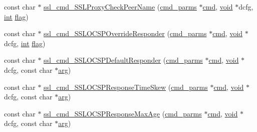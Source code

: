 \begin{DoxyCompactItemize}
\item 
const char $\ast$ \hyperlink{group__MOD__SSL__PRIVATE_ga1680991d78101944b35d1033291deefc}{ssl\+\_\+cmd\+\_\+\+S\+S\+L\+Proxy\+Check\+Peer\+Name} (\hyperlink{group__APACHE__CORE__CONFIG_ga1791fbd28d06a9847bad001541c5241e}{cmd\+\_\+parms} $\ast$\hyperlink{group__apr__thread__proc_ga7b715f5a87a71c6766684c1798251237}{cmd}, \hyperlink{group__MOD__ISAPI_gacd6cdbf73df3d9eed42fa493d9b621a6}{void} $\ast$dcfg, \hyperlink{pcre_8txt_a42dfa4ff673c82d8efe7144098fbc198}{int} \hyperlink{group__apr__mmap_gac9ec9a6de38e93927dca656ab65d0087}{flag})
\item 
const char $\ast$ \hyperlink{group__MOD__SSL__PRIVATE_ga19370828f87340e0ddd9bee5dfa74638}{ssl\+\_\+cmd\+\_\+\+S\+S\+L\+O\+C\+S\+P\+Override\+Responder} (\hyperlink{group__APACHE__CORE__CONFIG_ga1791fbd28d06a9847bad001541c5241e}{cmd\+\_\+parms} $\ast$\hyperlink{group__apr__thread__proc_ga7b715f5a87a71c6766684c1798251237}{cmd}, \hyperlink{group__MOD__ISAPI_gacd6cdbf73df3d9eed42fa493d9b621a6}{void} $\ast$dcfg, \hyperlink{pcre_8txt_a42dfa4ff673c82d8efe7144098fbc198}{int} \hyperlink{group__apr__mmap_gac9ec9a6de38e93927dca656ab65d0087}{flag})
\item 
const char $\ast$ \hyperlink{group__MOD__SSL__PRIVATE_ga33fbb291289472efd27beb62940c44f5}{ssl\+\_\+cmd\+\_\+\+S\+S\+L\+O\+C\+S\+P\+Default\+Responder} (\hyperlink{group__APACHE__CORE__CONFIG_ga1791fbd28d06a9847bad001541c5241e}{cmd\+\_\+parms} $\ast$\hyperlink{group__apr__thread__proc_ga7b715f5a87a71c6766684c1798251237}{cmd}, \hyperlink{group__MOD__ISAPI_gacd6cdbf73df3d9eed42fa493d9b621a6}{void} $\ast$dcfg, const char $\ast$\hyperlink{group__APACHE__CORE__MUTEX_gaf6517210150d97cd5cb8a17e3768770d}{arg})
\item 
const char $\ast$ \hyperlink{group__MOD__SSL__PRIVATE_ga2e4c6b9977860eaacee0f78edc5d8d0e}{ssl\+\_\+cmd\+\_\+\+S\+S\+L\+O\+C\+S\+P\+Response\+Time\+Skew} (\hyperlink{group__APACHE__CORE__CONFIG_ga1791fbd28d06a9847bad001541c5241e}{cmd\+\_\+parms} $\ast$\hyperlink{group__apr__thread__proc_ga7b715f5a87a71c6766684c1798251237}{cmd}, \hyperlink{group__MOD__ISAPI_gacd6cdbf73df3d9eed42fa493d9b621a6}{void} $\ast$dcfg, const char $\ast$\hyperlink{group__APACHE__CORE__MUTEX_gaf6517210150d97cd5cb8a17e3768770d}{arg})
\item 
const char $\ast$ \hyperlink{group__MOD__SSL__PRIVATE_gaa5356f67990fd4833cb307a92fb0df8e}{ssl\+\_\+cmd\+\_\+\+S\+S\+L\+O\+C\+S\+P\+Response\+Max\+Age} (\hyperlink{group__APACHE__CORE__CONFIG_ga1791fbd28d06a9847bad001541c5241e}{cmd\+\_\+parms} $\ast$\hyperlink{group__apr__thread__proc_ga7b715f5a87a71c6766684c1798251237}{cmd}, \hyperlink{group__MOD__ISAPI_gacd6cdbf73df3d9eed42fa493d9b621a6}{void} $\ast$dcfg, const char $\ast$\hyperlink{group__APACHE__CORE__MUTEX_gaf6517210150d97cd5cb8a17e3768770d}{arg})

\end{DoxyCompactItemize}
